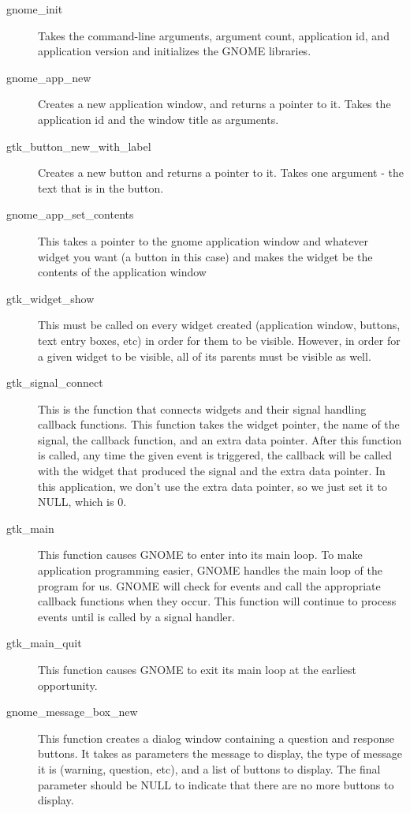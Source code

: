 \begin{description}
\item[gnome\_init] Takes the command-line arguments, argument count, application
id, and application version and initializes the GNOME 
libraries.
\item[gnome\_app\_new] Creates a new application window, and returns a pointer to it.
Takes the application id and the window title as arguments.
\item[gtk\_button\_new\_with\_label] Creates a new button and returns a pointer to it.
Takes one argument - the text that is in the button.
\item[gnome\_app\_set\_contents] This takes a pointer to the gnome application window
and whatever widget you want (a button in this case) and 
makes the widget be the contents of the application window
\item[gtk\_widget\_show] This must be called on every widget created (application 
window, buttons, text entry boxes, etc) in order
for them to be visible.  However, in order for a given 
widget to be visible, all of its parents must be visible 
as well.
\item[gtk\_signal\_connect] This is the function that connects widgets and their
signal handling callback functions.  This function takes
the widget pointer, the name of the signal, the callback
function, and an extra data pointer.  After this function
is called, any time the given event is triggered, the 
callback will be called with the widget that produced
the signal and the extra data pointer.  In this application,
we don't use the extra data pointer, so we just set it to
NULL, which is 0.
\item[gtk\_main] This function causes GNOME to enter into its main loop.
To make application programming easier, GNOME handles the
main loop of the program for us.  GNOME will check for
events and call the appropriate callback functions when
they occur.  This function will continue to process events
until  is called by a signal
handler.
\item[gtk\_main\_quit] This function causes GNOME to exit its main loop at the
earliest opportunity.
\item[gnome\_message\_box\_new] This function creates a dialog window containing a question
and response buttons.  It takes as parameters the message
to display, the type of message it is (warning, question, etc),
and a list of buttons to display.  The final parameter should
be NULL to indicate that there are no more buttons to display.

\end{description}
